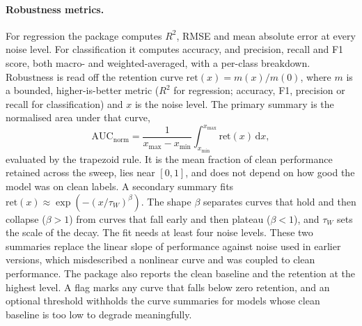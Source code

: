 \paragraph{Robustness metrics.} For regression the package computes $R^2$, RMSE and mean absolute
error at every noise level. For classification it computes accuracy, and precision, recall and F1
score, both macro- and weighted-averaged, with a per-class breakdown. Robustness is read off the
retention curve $\mathrm{ret}(x) = m(x)/m(0)$, where $m$ is a bounded, higher-is-better metric
($R^2$ for regression; accuracy, F1, precision or recall for classification) and $x$ is the noise
level. The primary summary is the normalised area under that curve,
\begin{equation}
\mathrm{AUC}_{\mathrm{norm}} = \frac{1}{x_{\max} - x_{\min}} \int_{x_{\min}}^{x_{\max}} \mathrm{ret}(x)\,\mathrm{d}x,
\label{eq:auc_norm}
\end{equation}
evaluated by the trapezoid rule. It is the mean fraction of clean performance retained across the
sweep, lies near $[0, 1]$, and does not depend on how good the model was on clean labels. A
secondary summary fits $\mathrm{ret}(x) \approx \exp\!\left(-(x/\tau_W)^{\beta}\right)$. The shape
$\beta$ separates curves that hold and then collapse ($\beta > 1$) from curves that fall early and
then plateau ($\beta < 1$), and $\tau_W$ sets the scale of the decay. The fit needs at least four
noise levels. These two summaries replace the linear slope of performance against noise used in
earlier versions, which misdescribed a nonlinear curve and was coupled to clean performance. The
package also reports the clean baseline and the retention at the highest level. A flag marks any
curve that falls below zero retention, and an optional threshold withholds the curve summaries for
models whose clean baseline is too low to degrade meaningfully.

